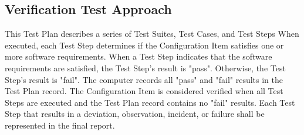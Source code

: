 \subsection{Verification Test Approach}
This Test Plan describes a series of Test Suites, Test Cases, and Test Steps
When executed, each Test Step determines if the Configuration Item satisfies one
or more software requirements.  When a Test Step indicates that the software
requirements are satisfied, the Test Step's result is "pass".  Otherwise, the
Test Step's result is "fail".  The computer records all "pass" and "fail"
results in the Test Plan record.  The Configuration Item is considered
verified when all Test Steps are executed and the Test Plan record contains
no "fail" results.  Each Test Step that results in a deviation, observation,
incident, or failure shall be represented in the final report.

